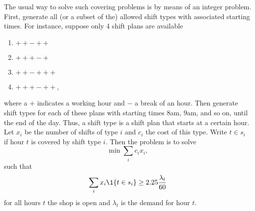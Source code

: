 The usual way to solve such covering problems is by means of an integer
problem. First, generate all (or a subset of the) allowed shift types
with associated starting times. For instance, suppose only 4 shift
plans are available
\begin{enumerate}
\item $++-++$
\item $+++-+$
\item $++-+++$
\item $+++-++$,
\end{enumerate}
where a $+$ indicates a working hour and $-$ a break of an hour. Then
generate shift types for each of these plans with starting times
$8$am, $9$am, and so on, until the end of the day. Thus, a shift type
is a shift plan that starts at a certain hour. Let $x_i$ be the number
of shifts of type $i$ and $c_i$ the cost of this type. Write $t\in s_i$ if
hour $t$ is covered by shift type $i$. Then the problem is to solve
\begin{equation*}
 \min \sum_i c_i x_i,
\end{equation*}
such that 
\begin{equation*}
 \sum_i x_i \1{t \in s_i} \geq 2.25 \frac{\lambda_t}{60}
\end{equation*}
for all hours $t$ the shop is open and $\lambda_t$ is the demand for
hour $t$.








